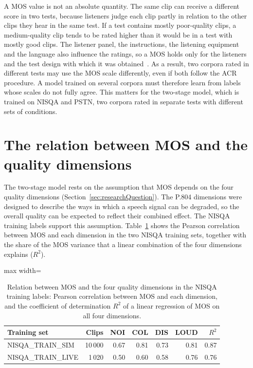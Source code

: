 \documentclass[
english,                 %
bibtex,                  %
includeExtraAbstracts, %
]{kththesis}
\numberwithin{listing}{chapter}
\begin{document}
A MOS value is not an absolute quantity. The same clip can receive a different score in two tests, because listeners judge each clip partly in relation to the other clips they hear in the same test. If a test contains mostly poor-quality clips, a medium-quality clip tends to be rated higher than it would be in a test with mostly good clips. The listener panel, the instructions, the listening equipment and the language also influence the ratings, so a MOS holds only for the listeners and the test design with which it was obtained~\cite{itu_p1401,mittag_biasaware_2021}. As a result, two corpora rated in different tests may use the MOS scale differently, even if both follow the ACR procedure. A model trained on several corpora must therefore learn from labels whose scales do not fully agree. This matters for the two-stage model, which is trained on NISQA and PSTN, two corpora rated in separate tests with different sets of conditions.

\section{The relation between MOS and the quality dimensions}
\label{sec:mosAndDimensions}

The two-stage model rests on the assumption that MOS depends on the four quality dimensions (Section~\ref{sec:researchQuestion}). The P.804 dimensions were designed to describe the ways in which a speech signal can be degraded, so the overall quality can be expected to reflect their combined effect. The NISQA training labels support this assumption. Table~\ref{tab:mosDimCorrelation} shows the Pearson correlation between MOS and each dimension in the two NISQA training sets, together with the share of the MOS variance that a linear combination of the four dimensions explains ($R^2$).

\begin{table}[!ht]
  \centering
  \caption{Relation between MOS and the four quality dimensions in the NISQA training labels: Pearson correlation between MOS and each dimension, and the coefficient of determination $R^2$ of a linear regression of MOS on all four dimensions.}
  \label{tab:mosDimCorrelation}
  \setlength{\tabcolsep}{4pt}
  \begin{adjustbox}{max width=\textwidth}
  \begin{tabular}{lrrrrrr}
    \toprule
    Training set & Clips & NOI & COL & DIS & LOUD & $R^2$ \\
    \midrule
    NISQA\_TRAIN\_SIM  & 10\,000 & 0.67 & 0.81 & 0.73 & 0.81 & 0.87 \\
    NISQA\_TRAIN\_LIVE & 1\,020  & 0.50 & 0.60 & 0.58 & 0.76 & 0.76 \\
    \bottomrule
  \end{tabular}
  \end{adjustbox}
\end{table}
\end{document}
